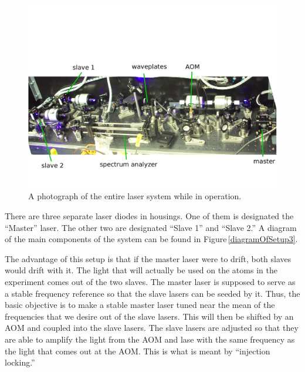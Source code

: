 \begin{figure}
    \centerline{\includegraphics[width=1\textwidth]{entire_setup}}
    \caption[Photo of Entire System]{\label{fullexperimentphoto}
A photograph of the entire laser system while in operation. 
    }
\end{figure}

There are three separate laser diodes in housings. One of them is designated the ``Master'' laser. The other two are designated ``Slave 1'' and ``Slave 2.'' 
 A diagram of the main components of the system can be found in Figure\,\ref{diagramOfSetup3}.

The advantage of this setup is that if the master laser were to drift, both slaves would drift with it. The light that will actually be used on the atoms in the experiment comes out of the two slaves. The master laser is supposed to serve as a stable frequency reference so that the slave lasers can be seeded by it. Thus, the basic objective is to make a stable master laser tuned near the mean of the frequencies that we desire out of the slave lasers. This will then be shifted by an AOM and coupled into the slave lasers. The slave lasers are adjusted so that they are able to amplify the light from the AOM and lase with the same frequency as the light that comes out at the AOM. This is what is meant by ``injection locking.''

